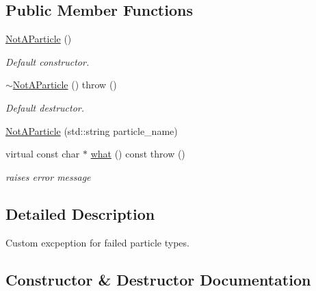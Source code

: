 \subsection*{Public Member Functions}
\begin{DoxyCompactItemize}
\item 
\mbox{\label{classpyne_1_1particle_1_1_not_a_particle_af98a293003d5e5a570685c5985b7c501}} 
\hyperlink{classpyne_1_1particle_1_1_not_a_particle_af98a293003d5e5a570685c5985b7c501}{Not\+A\+Particle} ()
\begin{DoxyCompactList}\small\item\em Default constructor. \end{DoxyCompactList}\item 
\mbox{\label{classpyne_1_1particle_1_1_not_a_particle_abe61e24b09e9846161bc264a1dc7978d}} 
\hyperlink{classpyne_1_1particle_1_1_not_a_particle_abe61e24b09e9846161bc264a1dc7978d}{$\sim$\+Not\+A\+Particle} ()  throw ()
\begin{DoxyCompactList}\small\item\em Default destructor. \end{DoxyCompactList}\item 
\hyperlink{classpyne_1_1particle_1_1_not_a_particle_a556fb7c90fc5e4c6ea1c394a86746fc9}{Not\+A\+Particle} (std\+::string particle\+\_\+name)
\item 
\mbox{\label{classpyne_1_1particle_1_1_not_a_particle_afb6430ca85548223debf2a9e846ba371}} 
virtual const char $\ast$ \hyperlink{classpyne_1_1particle_1_1_not_a_particle_afb6430ca85548223debf2a9e846ba371}{what} () const  throw ()
\begin{DoxyCompactList}\small\item\em raises error message \end{DoxyCompactList}\end{DoxyCompactItemize}


\subsection{Detailed Description}
Custom excpeption for failed particle types. 

\subsection{Constructor \& Destructor Documentation}
\mbox{\label{classpyne_1_1particle_1_1_not_a_particle_a556fb7c90fc5e4c6ea1c394a86746fc9}} 
